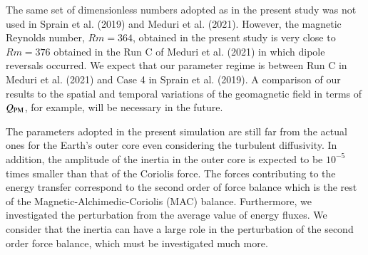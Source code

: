 The same set of dimensionless numbers adopted as in the present study was not used in Sprain et al. (2019) and Meduri et al. (2021).
However, the magnetic Reynolds number, $Rm = 364$, obtained in the present study is very close to $Rm = 376$ obtained in the Run C of Meduri et al. (2021) in which dipole reversals occurred.
We expect that our parameter regime is between Run C in Meduri et al. (2021) and Case 4 in Sprain et al. (2019). 
A comparison of our results to the spatial and temporal variations of the geomagnetic field in terms of $Q_{\rm PM}$, for example, will be necessary in the future.

The parameters adopted in the present simulation are still far from the actual ones for the Earth's outer core even considering the turbulent diffusivity. 
In addition, the amplitude of the inertia in the outer core is expected to be $10^{-5}$ times smaller than that of the Coriolis force. 
The forces contributing to the energy transfer correspond to the second order of force balance which is the rest of the Magnetic-Alchimedic-Coriolis (MAC) balance. 
Furthermore, we investigated the perturbation from the average value of energy fluxes. 
We consider that the inertia can have a large role in the perturbation of the second order force balance, which must be investigated much more.


